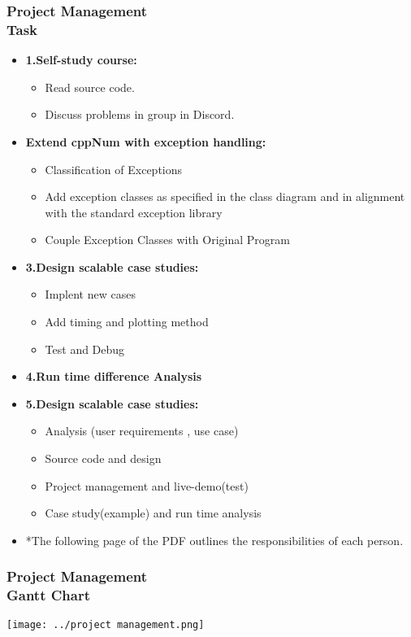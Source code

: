 \documentclass[ucs,10pt]{beamer}
\begin{document}
\begin{frame}
\frametitle{Project Management \\
	\small \color{rwth-blue} Task}
	\begin{itemize}	
            \item \textbf{1.Self-study course:}
				\begin{itemize}
					\item Read source code.
					\item Discuss problems in group in Discord.
				\end{itemize}
			\item \textbf{Extend cppNum with exception handling:}
				\begin{itemize}
					\item Classification of Exceptions
					\item Add exception classes as specified in the class diagram and in alignment with the standard exception library
					\item Couple Exception Classes with Original Program
				\end{itemize}
			\item \textbf{3.Design scalable case studies:}
				\begin{itemize}
				\item Implent new cases
				\item Add timing and plotting method
				\item Test and Debug
				\end{itemize}
			\item \textbf{4.Run time difference Analysis}
			\item \textbf{5.Design scalable case studies:}
				\begin{itemize}
				\item Analysis (user requirements , use case)
				\item Source code and design
				\item Project management and live-demo(test)
				\item Case study(example) and run time analysis
				\end{itemize}
			\item *The following page of the PDF outlines the responsibilities of each person.
	\end{itemize}
\end{frame}

\begin{frame}
\frametitle{Project Management \\
    \small \color{rwth-blue} Gantt Chart}
    
    \begin{center}
        \texttt{[image: ../project management.png]}
    \end{center}
\end{frame}
\end{document}
